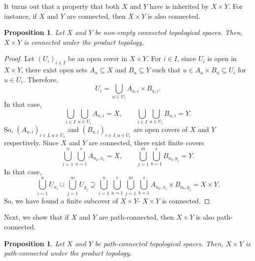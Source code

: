 \documentclass[a4paper, openany]{memoir}
\theoremstyle{definition}
\theoremstyle{plain}
\newtheorem{proposition}[definition]{Proposition}
\begin{document}
It turns out that a property that both $X$ and $Y$ have is inherited by $X \times Y$. For instance, if $X$ and $Y$ are connected, then $X \times Y$ is also connected.
\begin{proposition}
Let $X$ and $Y$ be non-empty connected topological spaces. Then, $X \times Y$ is connected under the product topology.
\end{proposition}
\begin{proof}
Let $(U_i)_{i \in I}$ be an open cover in $X \times Y$. For $i \in I$, since $U_i$ is open in $X \times Y$, there exist open sets $A_u \subseteq X$ and $B_u \subseteq Y$ such that $u \in A_u \times B_u \subseteq U_i$ for $u \in U_i$. Therefore,
\[U_i = \bigcup_{u \in U_i} A_{u, i} \times B_{u, i}.\]
In that case,
\[\bigcup_{i \in I} \bigcup_{u \in U_i} A_{u, i} = X, \qquad \bigcup_{i \in I} \bigcup_{u \in U_i} B_{u, i} = Y.\]
So, $(A_{u, i})_{i \in I, u \in U_i}$ and $(B_{u, i})_{i \in I, u \in U_i}$ are open covers of $X$ and $Y$ respectively. Since $X$ and $Y$ are connected, there exist finite covers
\[\bigcup_{i=1}^n \bigcup_{a=1}^r A_{u_a, x_i} = X, \qquad \bigcup_{j=1}^m \bigcup_{b=1}^s B_{u_b, y_j} = Y.\]
In that case,
\[\bigcup_{i=1}^n U_{x_i} \cup \bigcup_{j=1}^m U_{y_j} \supseteq \bigcup_{i=1}^n \bigcup_{a=1}^r \bigcup_{j=1}^m \bigcup_{b=1}^s A_{u_a, x_i} \times B_{u_b, y_j} = X \times Y.\]
So, we have found a finite subcover of $X \times Y$- $X \times Y$ is connected.
\end{proof}
\noindent Next, we show that if $X$ and $Y$ are path-connected, then $X \times Y$ is also path-connected.
\begin{proposition}
Let $X$ and $Y$ be path-connected topological spaces. Then, $X \times Y$ is path-connected under the product topology.
\end{proposition}
\end{document}

